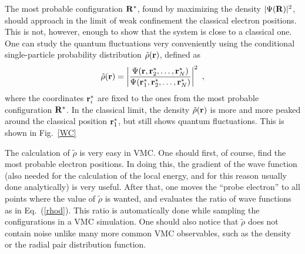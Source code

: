 \documentclass{article}
\begin{document}
The most probable configuration ${\bf R}^*$, found by maximizing the
density $| \Psi({\bf R}) |^2$, should approach in the limit of weak
confinement the classical electron positions. This is not, however,
enough to show that the system is close to a classical one. One can
study the quantum fluctuations very conveniently using the conditional
single-particle probability distribution $\tilde \rho ({\bf r})$,
defined as
\begin{equation}
\tilde \rho ({\bf r}) = \left | \frac{\Psi({\bf r},{\bf
r}^*_2,\dots,{\bf r}^*_{N})}{\Psi({\bf r}_{1}^{*},{\bf
r}^*_2,\dots,{\bf r}^*_{N})} \right |^2 \ ,
\label{rhod}
\end{equation}
where the coordinates ${\bf r}_i^*$ are fixed to the ones from the
most probable configuration ${\bf R}^*$. In the classical limit, the
density $\tilde \rho ({\bf r})$ is more and more peaked around the
classical position ${\bf r}_1^*$, but still shows quantum
fluctuations.  This is shown in Fig.~\ref{WC}

The calculation of $\tilde \rho$ is very easy in VMC.  One should
first, of course, find the most probable electron positions.  In doing
this, the gradient of the wave function (also needed for the
calculation of the local energy, and for this reason usually done
analytically) is very useful. After that, one moves the ``probe
electron'' to all points where the value of $\tilde \rho$ is wanted,
and evaluates the ratio of wave functions as in Eq.~(\ref{rhod}).
This ratio is automatically done while sampling the configurations in a
VMC simulation.  One should also notice that $\tilde \rho$ does not
contain noise unlike many more common VMC observables, such as the
density or the radial pair distribution function.
\end{document}
